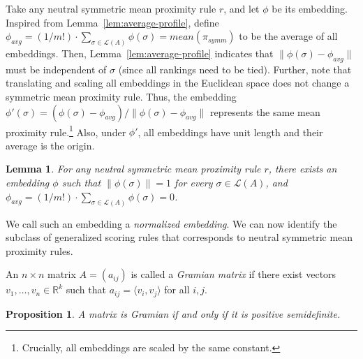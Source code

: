 \documentclass[10pt,letterpaper]{article}
\newcommand{\calL}{{\mathcal{L}}}
\newcommand{\rank}{{\calL(A)}}
\newtheorem{lemma}{Lemma}
\newtheorem{proposition}{Proposition}
\newenvironment{definition}[1][Definition]{\begin{trivlist}
\item[\hskip \labelsep {\bfseries #1}]}{\end{trivlist}}
\begin{document}
Take any neutral symmetric mean proximity rule $r$, and let $\phi$ be its embedding. Inspired from Lemma~\ref{lem:average-profile}, define $\phi_{avg} = (1/{m!}) \cdot \sum_{\sigma \in \rank} \phi(\sigma) = mean(\pi_{symm})$ to be the average of all embeddings. Then, Lemma~\ref{lem:average-profile} indicates that $\|\phi(\sigma)-\phi_{avg}\|$ must be independent of $\sigma$ (since all rankings need to be tied). Further, note that translating and scaling all embeddings in the Euclidean space does not change a symmetric mean proximity rule. Thus, the embedding $\phi'(\sigma) = (\phi(\sigma)-\phi_{avg})/\|\phi(\sigma)-\phi_{avg}\|$ represents the same mean proximity rule.\footnote{Crucially, all embeddings are scaled by the same constant.} Also, under $\phi'$, all embeddings have unit length and their average is the origin. 

\begin{lemma}
For any neutral symmetric mean proximity rule $r$, there exists an embedding $\phi$ such that $\|\phi(\sigma)\| = 1$ for every $\sigma \in \rank$, and $\phi_{avg} = (1/{m!}) \cdot \sum_{\sigma \in \rank} \phi(\sigma) = 0$.
\label{lem:normalized-embedding}
\end{lemma}

We call such an embedding a \emph{normalized embedding}. We can now identify the subclass of generalized scoring rules that corresponds to neutral symmetric mean proximity rules. 
\begin{definition}[Gramian Matrix]
An $n \times n$ matrix $A = (a_{ij})$ is called a \emph{Gramian matrix} if there exist vectors $v_1,\ldots,v_n \in \mathbb{R}^k$ such that $a_{ij} = \langle v_i,v_j \rangle$ for all $i,j$. 
\end{definition}

\begin{proposition}
A matrix is Gramian if and only if it is positive semidefinite.
\label{prop:gramian}
\end{proposition}
\end{document}

